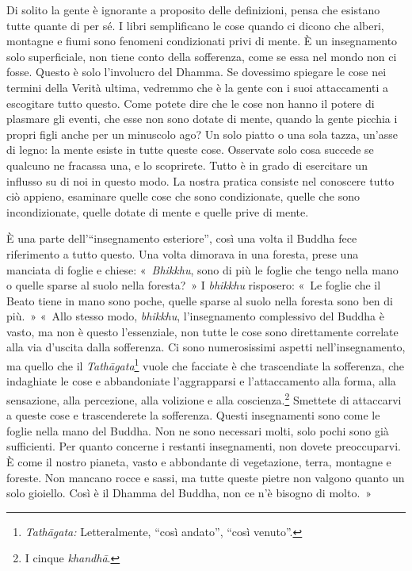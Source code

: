 Di solito la gente è ignorante a proposito delle definizioni, pensa che
esistano tutte quante di per sé. I libri semplificano le cose quando ci
dicono che alberi, montagne e fiumi sono fenomeni condizionati privi di
mente. È un insegnamento solo superficiale, non tiene conto della
sofferenza, come se essa nel mondo non ci fosse. Questo è solo
l'involucro del Dhamma. Se dovessimo spiegare le cose nei termini della
Verità ultima, vedremmo che è la gente con i suoi attaccamenti a
escogitare tutto questo. Come potete dire che le cose non hanno il
potere di plasmare gli eventi, che esse non sono dotate di mente, quando
la gente picchia i propri figli anche per un minuscolo ago? Un solo
piatto o una sola tazza, un'asse di legno: la mente esiste in tutte
queste cose. Osservate solo cosa succede se qualcuno ne fracassa una, e
lo scoprirete. Tutto è in grado di esercitare un influsso su di noi in
questo modo. La nostra pratica consiste nel conoscere tutto ciò appieno,
esaminare quelle cose che sono condizionate, quelle che sono
incondizionate, quelle dotate di mente e quelle prive di mente.

È una parte dell'``insegnamento esteriore'', così una volta il Buddha
fece riferimento a tutto questo. Una volta dimorava in una foresta,
prese una manciata di foglie e chiese: «~\emph{Bhikkhu}, sono di più le
foglie che tengo nella mano o quelle sparse al suolo nella foresta?~» I
\emph{bhikkhu} risposero: «~Le foglie che il Beato tiene in mano sono
poche, quelle sparse al suolo nella foresta sono ben di più.~» «~Allo
stesso modo, \emph{bhikkhu}, l'insegnamento complessivo del Buddha è
vasto, ma non è questo l'essenziale, non tutte le cose sono direttamente
correlate alla via d'uscita dalla sofferenza. Ci sono numerosissimi
aspetti nell'insegnamento, ma quello che il \emph{Tathāgata}\footnote{\emph{Tathāgata:}
  Letteralmente, ``così andato'', ``così venuto''.} vuole che facciate è
che trascendiate la sofferenza, che indaghiate le cose e abbandoniate
l'aggrapparsi e l'attaccamento alla forma, alla sensazione, alla
percezione, alla volizione e alla coscienza.\footnote{I cinque
  \emph{khandhā}.} Smettete di attaccarvi a queste cose e trascenderete
la sofferenza. Questi insegnamenti sono come le foglie nella mano del
Buddha. Non ne sono necessari molti, solo pochi sono già sufficienti.
Per quanto concerne i restanti insegnamenti, non dovete preoccuparvi. È
come il nostro pianeta, vasto e abbondante di vegetazione, terra,
montagne e foreste. Non mancano rocce e sassi, ma tutte queste pietre
non valgono quanto un solo gioiello. Così è il Dhamma del Buddha, non ce
n'è bisogno di molto.~»

